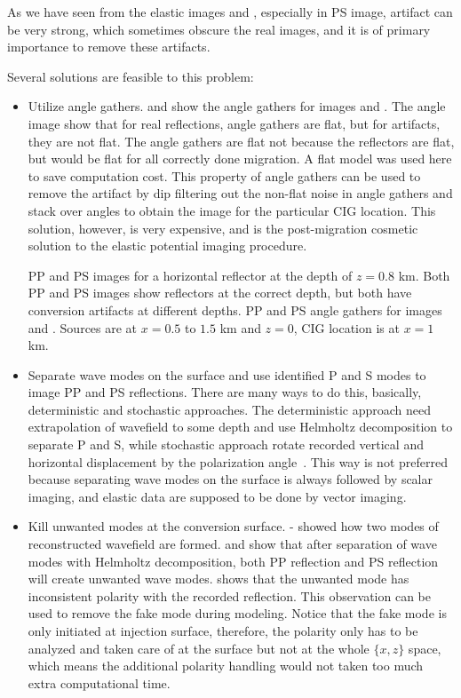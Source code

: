 As we have seen from the elastic images  and , especially in PS image, artifact can be very strong, which sometimes obscure the real images, and it is of primary importance to remove these artifacts.

Several solutions are feasible to this problem:
\begin{itemize}
\item Utilize angle gathers.  and  show the angle gathers for images  and . The angle image show that for real reflections, angle gathers are flat, but for artifacts, they are not flat. The angle gathers are flat not because the reflectors are flat, but would be flat for all correctly done migration. A flat model was used here to save computation cost. This property of angle gathers can be used to remove the artifact by dip filtering out the non-flat noise in angle gathers and stack over angles to obtain the image for the particular CIG location.
This solution, however, is very expensive, and is the post-migration cosmetic solution to the elastic potential imaging procedure.


{PP and PS images for a horizontal reflector at the depth of $z=0.8$
km. Both PP and PS images show reflectors at the correct depth, but
both have conversion artifacts at different depths.}
{PP and PS angle gathers for images 
and . Sources are at $x=0.5$ to $1.5$ km and
$z=0$, CIG location is at $x=1$ km.}

\item Separate wave modes on the surface and use identified P and S modes to image PP and PS reflections. There are many ways to do this, basically, deterministic and stochastic approaches. The deterministic approach need extrapolation of wavefield to some depth and use Helmholtz decomposition to separate P and S, while stochastic approach rotate recorded vertical and horizontal displacement by the polarization angle~\cite[]{SEG-1989-1308}.
This way is not preferred because separating wave modes on the surface
is always followed by scalar imaging, and elastic data are supposed to
be done by vector imaging.


\item Kill unwanted modes at the conversion surface. - showed how two modes of reconstructed wavefield are formed.  and  show that after separation of wave modes with Helmholtz decomposition, both PP reflection and PS reflection will create unwanted wave modes.  shows that the unwanted mode has inconsistent polarity with the recorded reflection. This observation can be used to remove the fake mode during modeling. Notice that the fake mode is only initiated at injection surface, therefore, the polarity only has to be analyzed and taken care of at the surface but not at the whole $\{x,z\}$ space, which means the additional polarity handling would not taken too much extra computational time.


\end{itemize}
